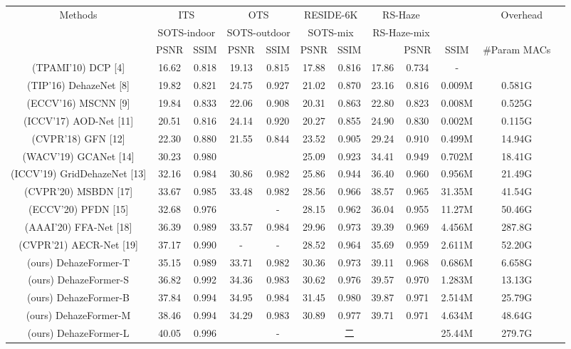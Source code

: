 \begin{table}[htbp]
\centering
\begin{tabular}{|c|c|c|c|c|c|c|c|c|c|c|c|}\hline
\multirow{2}{*}{Methods} & \multicolumn{2}{c|}{ITS} & \multicolumn{2}{c|}{OTS} & \multicolumn{2}{c|}{RESIDE-6K} & \multicolumn{2}{c|}{RS-Haze} & \multirow{2}{*}{} & \multicolumn{2}{c|}{\multirow{2}{*}{Overhead}} \\ \cline{2-9}
  & \multicolumn{2}{c|}{SOTS-indoor} & \multicolumn{2}{c|}{SOTS-outdoor} & \multicolumn{2}{c|}{SOTS-mix} & \multicolumn{2}{c|}{RS-Haze-mix} &   &   &   \\ \hline
 & PSNR & SSIM & PSNR & SSIM & PSNR & SSIM &  & PSNR & SSIM & #Param MACs &  \\ \hline
(TPAMI'10) DCP [4] & 16.62 & 0.818 & 19.13 & 0.815 & 17.88 & 0.816 & 17.86 & 0.734 & - &  &  \\ \hline
(TIP'16) DehazeNet [8] & 19.82 & 0.821 & 24.75 & 0.927 & 21.02 & 0.870 & 23.16 & 0.816 & 0.009M & 0.581G &  \\ \hline
(ECCV'16) MSCNN [9] & 19.84 & 0.833 & 22.06 & 0.908 & 20.31 & 0.863 & 22.80 & 0.823 & 0.008M & 0.525G &  \\ \hline
(ICCV'17) AOD-Net [11] & 20.51 & 0.816 & 24.14 & 0.920 & 20.27 & 0.855 & 24.90 & 0.830 & 0.002M & 0.115G &  \\ \hline
(CVPR'18) GFN [12] & 22.30 & 0.880 & 21.55 & 0.844 & 23.52 & 0.905 & 29.24 & 0.910 & 0.499M & 14.94G &  \\ \hline
(WACV'19) GCANet [14] & 30.23 & 0.980 &  &  & 25.09 & 0.923 & 34.41 & 0.949 & 0.702M & 18.41G &  \\ \hline
(ICCV'19) GridDehazeNet [13] & 32.16 & 0.984 & 30.86 & 0.982 & 25.86 & 0.944 & 36.40 & 0.960 & 0.956M & 21.49G &  \\ \hline
(CVPR'20) MSBDN [17] & 33.67 & 0.985 & 33.48 & 0.982 & 28.56 & 0.966 & 38.57 & 0.965 & 31.35M & 41.54G &  \\ \hline
(ECCV'20) PFDN [15] & 32.68 & 0.976 &  & - & 28.15 & 0.962 & 36.04 & 0.955 & 11.27M & 50.46G &  \\ \hline
(AAAI'20) FFA-Net [18] & 36.39 & 0.989 & 33.57 & 0.984 & 29.96 & 0.973 & 39.39 & 0.969 & 4.456M & 287.8G &  \\ \hline
(CVPR'21) AECR-Net [19] & 37.17 & 0.990 & - & - & 28.52 & 0.964 & 35.69 & 0.959 & 2.611M & 52.20G &  \\ \hline
(ours) DehazeFormer-T & 35.15 & 0.989 & 33.71 & 0.982 & 30.36 & 0.973 & 39.11 & 0.968 & 0.686M & 6.658G &  \\ \hline
(ours) DehazeFormer-S & 36.82 & 0.992 & 34.36 & 0.983 & 30.62 & 0.976 & 39.57 & 0.970 & 1.283M & 13.13G &  \\ \hline
(ours) DehazeFormer-B & 37.84 & 0.994 & 34.95 & 0.984 & 31.45 & 0.980 & 39.87 & 0.971 & 2.514M & 25.79G &  \\ \hline
(ours) DehazeFormer-M & 38.46 & 0.994 & 34.29 & 0.983 & 30.89 & 0.977 & 39.71 & 0.971 & 4.634M & 48.64G &  \\ \hline
(ours) DehazeFormer-L & 40.05 & 0.996 &  & - &  & 二 &  &  & 25.44M & 279.7G &  \\ \hline
\end{tabular}\end{table}

